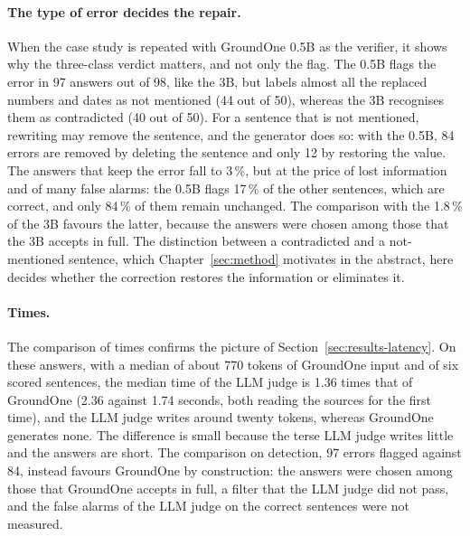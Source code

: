 \paragraph{The type of error decides the repair.} When the case study is repeated with GroundOne 0.5B as the verifier, it shows why
the three-class verdict matters, and not only the flag. The 0.5B flags the error in 97 answers out of 98, like the 3B,
but labels almost all the replaced numbers and dates as not mentioned (44 out of 50), whereas the 3B recognises them as
contradicted (40 out of 50). For a sentence that is not mentioned, rewriting may remove the sentence, and the generator
does so: with the 0.5B, 84 errors are removed by deleting the sentence and only 12 by restoring the value. The answers
that keep the error fall to 3\,\%, but at the price of lost information and of many false alarms: the 0.5B flags 17\,\% of the other sentences, which are correct, and only 84\,\% of them remain unchanged. The comparison with the 1.8\,\% of the 3B favours the latter, because the answers were chosen among those that the 3B accepts in full. The distinction between a
contradicted and a not-mentioned sentence, which Chapter~\ref{sec:method} motivates in the abstract, here decides
whether the correction restores the information or eliminates it.

\paragraph{Times.} The comparison of times confirms the picture of Section~\ref{sec:results-latency}. On these answers,
with a median of about 770 tokens of GroundOne input and of six scored sentences, the median time of the LLM judge is 1.36 times that of GroundOne (2.36 against 1.74 seconds, both reading the sources for the first time), and the LLM judge writes around twenty tokens, whereas GroundOne generates none. The
difference is small because the terse LLM judge writes little and the answers are short. The comparison on detection, 97
errors flagged against 84, instead favours GroundOne by construction: the answers were chosen among those that GroundOne
accepts in full, a filter that the LLM judge did not pass, and the false alarms of the LLM judge on the correct sentences were
not measured.

